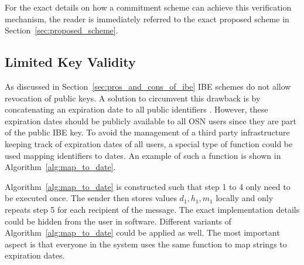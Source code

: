 For the exact details on how a commitment scheme can achieve this verification mechanism, the reader is immediately referred to the exact proposed scheme in Section~\ref{sec:proposed_scheme}.

\subsection{Limited Key Validity}
As discussed in Section~\ref{sec:pros_and_cons_of_ibe} IBE schemes do not allow revocation of public keys. A solution to circumvent this drawback is by concatenating an expiration date to all public identifiers \id{}. However, these expiration dates should be publicly available to all OSN users since they are part of the public IBE key. To avoid the management of a third party infrastructure keeping track of expiration dates of all users, a special type of function could be used mapping identifiers \id{} to dates. An example of such a function is shown in Algorithm~\ref{alg:map_to_date}.

Algorithm~\ref{alg:map_to_date} is constructed such that step 1 to 4 only need to be executed once. The sender then stores values $d_1, h_1, m_1$ locally and only repeats step 5 for each recipient of the message. The exact implementation details could be hidden from the user in software. Different variants of Algorithm~\ref{alg:map_to_date} could be applied as well. The most important aspect is that everyone in the system uses the same function to map strings to expiration dates.


